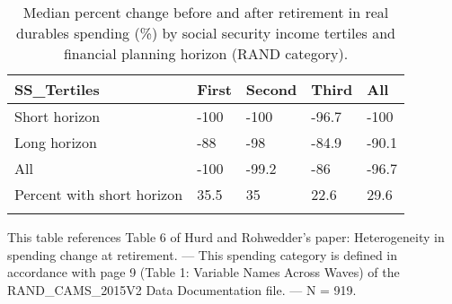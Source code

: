 \begin{table}[tbp] \centering
{}

\caption{Median percent change before and after retirement in real durables spending (\%) by social security income tertiles and financial planning horizon (RAND category).}
\begin{tabularx}{\textwidth}{lCCCC}

\toprule
{SS\_Tertiles}&{First}&{Second}&{Third}&{All} \tabularnewline
\midrule\addlinespace[1.5ex]
Short horizon&-100&-100&-96.7&-100 \tabularnewline
Long horizon&-88&-98&-84.9&-90.1 \tabularnewline
All&-100&-99.2&-86&-96.7 \tabularnewline
Percent with short horizon&35.5&35&22.6&29.6 \tabularnewline
\bottomrule \addlinespace[1.5ex]

\end{tabularx}
\begin{flushleft}
\footnotesize This table references Table 6 of Hurd and Rohwedder's paper: Heterogeneity in spending change at retirement. \linebreak --- \linebreak This spending category is defined in accordance with page 9 (Table 1: Variable Names Across Waves) of the RAND\_CAMS\_2015V2 Data Documentation file. \linebreak --- \linebreak N = 919.
\end{flushleft}
\end{table}
